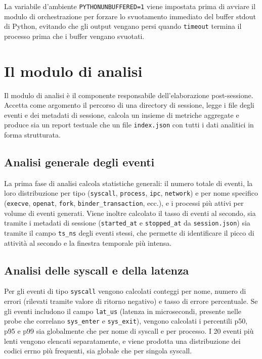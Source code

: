 La variabile d'ambiente \texttt{PYTHONUNBUFFERED=1} viene impostata prima di avviare il modulo di orchestrazione per forzare lo svuotamento immediato del buffer stdout di Python, evitando che gli output vengano persi quando \texttt{timeout} termina il processo prima che i buffer vengano svuotati.

\section{Il modulo di analisi}

Il modulo di analisi è il componente responsabile dell'elaborazione post-sessione. Accetta come argomento il percorso di una directory di sessione, legge i file degli eventi e dei metadati di sessione, calcola un insieme di metriche aggregate e produce sia un report testuale che un file \texttt{index.json} con tutti i dati analitici in forma strutturata.

\subsection{Analisi generale degli eventi}

La prima fase di analisi calcola statistiche generali: il numero totale di eventi, la loro distribuzione per tipo (\texttt{syscall}, \texttt{process}, \texttt{ipc}, \texttt{network}) e per nome specifico (\texttt{execve}, \texttt{openat}, \texttt{fork}, \texttt{binder\_transaction}, ecc.), e i processi più attivi per volume di eventi generati. Viene inoltre calcolato il tasso di eventi al secondo, sia tramite i metadati di sessione (\texttt{started\_at} e \texttt{stopped\_at} da \texttt{session.json}) sia tramite il campo \texttt{ts\_ns} degli eventi stessi, che permette di identificare il picco di attività al secondo e la finestra temporale più intensa.

\subsection{Analisi delle syscall e della latenza}

Per gli eventi di tipo \texttt{syscall} vengono calcolati conteggi per nome, numero di errori (rilevati tramite valore di ritorno negativo) e tasso di errore percentuale. Se gli eventi includono il campo \texttt{lat\_us} (latenza in microsecondi, presente nelle probe che correlano \texttt{sys\_enter} e \texttt{sys\_exit}), vengono calcolati i percentili p50, p95 e p99 sia globalmente che per nome di syscall e per processo. I 20 eventi più lenti vengono elencati separatamente, e viene prodotta una distribuzione dei codici errno più frequenti, sia globale che per singola syscall.

